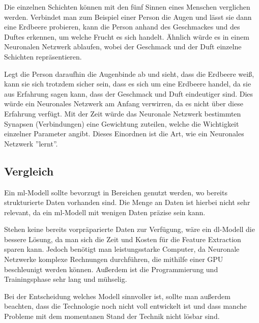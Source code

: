 Die einzelnen Schichten können mit den fünf Sinnen eines Menschen verglichen werden. Verbindet man zum Beispiel einer Person die Augen und lässt sie dann eine Erdbeere probieren, kann die Person anhand des Geschmackes und des Duftes erkennen, um welche Frucht es sich handelt. Ähnlich würde es in einem Neuronalen Netzwerk ablaufen, wobei der Geschmack und der Duft einzelne Schichten repräsentieren.

Legt die Person daraufhin die Augenbinde ab und sieht, dass die Erdbeere weiß, kann sie sich trotzdem sicher sein, dass es sich um eine Erdbeere handel, da sie aus Erfahrung sagen kann, dass der Geschmack und Duft eindeutiger sind. Dies würde ein Neuronales Netzwerk am Anfang verwirren, da es nicht über diese Erfahrung verfügt. Mit der Zeit würde das Neuronale Netzwerk bestimmten Synapsen (Verbindungen) eine Gewichtung zuteilen, welche die Wichtigkeit einzelner Parameter angibt. Dieses Einordnen ist die Art, wie ein Neuronales Netzwerk ''lernt''.\cite{NN}

\subsection{Vergleich}

Ein \gls{ml}-Modell sollte bevorzugt in Bereichen genutzt werden, wo bereits strukturierte Daten vorhanden sind. Die Menge an Daten ist hierbei nicht sehr relevant, da ein \gls{ml}-Modell mit wenigen Daten präzise sein kann.

Stehen keine bereits vorpräparierte Daten zur Verfügung, wäre ein \gls{dl}-Modell die bessere Lösung, da man sich die Zeit und Kosten für die Feature Extraction sparen kann. Jedoch benötigt man leistungsstarke Computer, da Neuronale Netzwerke komplexe Rechnungen durchführen, die mithilfe einer GPU beschleunigt werden können. Außerdem ist die Programmierung und Trainingsphase sehr lang und mühselig. \cite{MLvsDL}

Bei der Entscheidung welches Modell sinnvoller ist, sollte man außerdem beachten, dass die Technologie noch nicht voll entwickelt ist und dass manche Probleme mit dem momentanen Stand der Technik nicht lösbar sind.